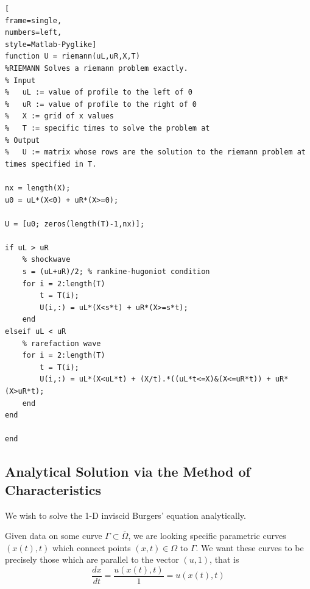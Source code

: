 \documentclass{myproject}
\begin{document}
\pagebreak
\begin{lstlisting}[
frame=single,
numbers=left,
style=Matlab-Pyglike]
function U = riemann(uL,uR,X,T)
%RIEMANN Solves a riemann problem exactly.
% Input
%   uL := value of profile to the left of 0
%   uR := value of profile to the right of 0
%   X := grid of x values
%   T := specific times to solve the problem at
% Output
%   U := matrix whose rows are the solution to the riemann problem at times specified in T.

nx = length(X);
u0 = uL*(X<0) + uR*(X>=0);

U = [u0; zeros(length(T)-1,nx)];

if uL > uR
    % shockwave
    s = (uL+uR)/2; % rankine-hugoniot condition
    for i = 2:length(T)
        t = T(i);
        U(i,:) = uL*(X<s*t) + uR*(X>=s*t); 
    end
elseif uL < uR
    % rarefaction wave
    for i = 2:length(T)
        t = T(i);
        U(i,:) = uL*(X<uL*t) + (X/t).*((uL*t<=X)&(X<=uR*t)) + uR*(X>uR*t);
    end
end

end
\end{lstlisting}

\pagebreak
\subsection{Analytical Solution via the Method of Characteristics}

We wish to solve the 1-D inviscid Burgers' equation analytically.

Given data on some curve $ \Gamma \subset \overline{\Omega} $, we are looking specific parametric curves $ (x(t), t) $ which connect points $(x, t) \in \Omega$ to $ \Gamma $. We want these curves to be precisely those which are parallel to the vector $(u, 1)$, that is
\[
    \frac{dx}{dt} = \frac{u(x(t), t)}{1} = u(x(t), t)
\]
\end{document}
